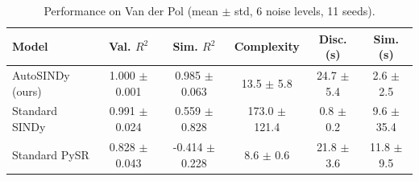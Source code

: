 \begin{table}[htbp]
\centering
\small
\renewcommand{\arraystretch}{1.2}
\caption{Performance on Van der Pol (mean $\pm$ std, 6 noise levels, 11 seeds).}
\label{tab:autosindy_vanderpol}
\begin{tabular}{lccccc}
\toprule
Model & Val. $R^2$ & Sim. $R^2$ & Complexity & Disc. (s) & Sim. (s) \\
\midrule
AutoSINDy (ours) & 1.000 $\pm$ 0.001 & 0.985 $\pm$ 0.063 & 13.5 $\pm$ 5.8 & 24.7 $\pm$ 5.4 & 2.6 $\pm$ 2.5 \\
Standard SINDy & 0.991 $\pm$ 0.024 & 0.559 $\pm$ 0.828 & 173.0 $\pm$ 121.4 & 0.8 $\pm$ 0.2 & 9.6 $\pm$ 35.4 \\
Standard PySR & 0.828 $\pm$ 0.043 & -0.414 $\pm$ 0.228 & 8.6 $\pm$ 0.6 & 21.8 $\pm$ 3.6 & 11.8 $\pm$ 9.5 \\
\bottomrule
\end{tabular}
\end{table}